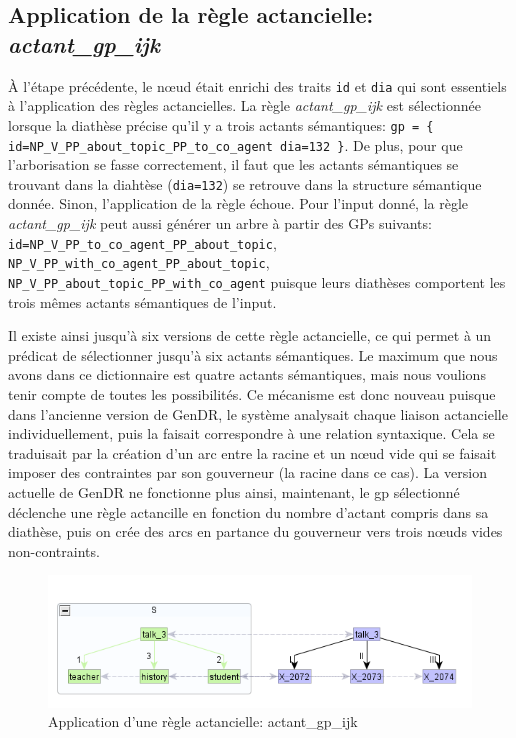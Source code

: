 \subsection{Application de la règle actancielle: \emph{actant\_gp\_ijk}}
À l'étape précédente, le n\oe{}ud  était enrichi des traits \texttt{id} et \texttt{dia} qui sont essentiels à l'application des règles actancielles. La règle \emph{actant\_gp\_ijk} est sélectionnée lorsque la diathèse précise qu'il y a trois actants sémantiques: \lstinline|gp = { id=NP_V_PP_about_topic_PP_to_co_agent dia=132 }|. De plus, pour que l'arborisation se fasse correctement, il faut que les actants sémantiques se trouvant dans la diahtèse (\texttt{dia=132}) se retrouve dans la structure sémantique donnée. Sinon, l'application de la règle échoue. Pour l'input donné, la règle \emph{actant\_gp\_ijk} peut aussi générer un arbre à partir des \acp{GP} suivants: \texttt{id=NP\_V\_PP\_to\_co\_agent\_PP\_about\_topic}, \texttt{NP\_V\_PP\_with\_co\_agent\_PP\_about\_topic}, \texttt{NP\_V\_PP\_about\_topic\_PP\_with\_co\_agent} puisque leurs diathèses comportent les trois mêmes actants sémantiques de l'input.

Il existe ainsi jusqu'à six versions de cette règle actancielle, ce qui permet à un prédicat de sélectionner jusqu'à six actants sémantiques. Le maximum que nous avons dans ce dictionnaire est quatre actants sémantiques, mais nous voulions tenir compte de toutes les possibilités. Ce mécanisme est donc nouveau puisque dans l'ancienne version de GenDR, le système analysait chaque liaison actancielle individuellement, puis la faisait correspondre à une relation syntaxique. Cela se traduisait par la création d'un arc entre la racine et un n\oe{}ud vide qui se faisait imposer des contraintes par son gouverneur (la racine dans ce cas). La version actuelle de GenDR ne fonctionne plus ainsi, maintenant, le gp sélectionné déclenche une règle actancille en fonction du nombre d'actant compris dans sa diathèse, puis on crée des arcs en partance du gouverneur vers trois n\oe{}uds vides non-contraints.

\begin{figure}[htb]
	\centering
	\includegraphics[width=1\textwidth, trim = {0cm 0cm 0cm 0cm},clip]{ch6/figs/actant_gp_ijk.png}
	\caption{Application d'une règle actancielle: actant\_gp\_ijk}
	\label{deroulement2}
\end{figure}

